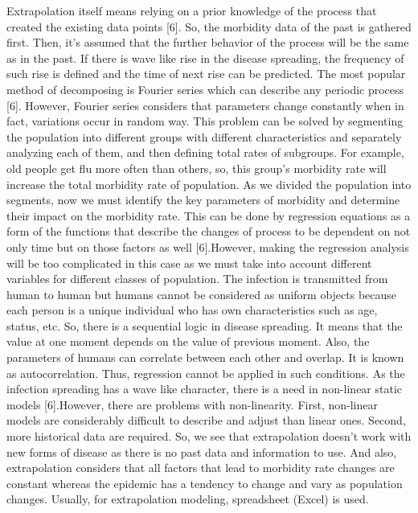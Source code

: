 Extrapolation itself means relying on a prior knowledge of the process that created the existing data points [6]. So, the morbidity data of the past is gathered first. Then, it’s assumed that the further behavior of the process will be the same as in the past. If there is wave like rise in the disease spreading, the frequency of such rise is defined and the time of next rise can be predicted. The most popular method of decomposing is Fourier series which can describe any periodic process [6]. However, Fourier series considers that parameters change constantly when in fact, variations occur in random way. This problem can be solved by segmenting the population into different groups with different characteristics and separately analyzing each of them, and then defining total rates of subgroups. For example, old people get flu more often than others, so, this group’s morbidity rate will increase the total morbidity rate of population. As we divided the population into segments, now we must identify the key parameters of morbidity and determine their impact on the morbidity rate. This can be done by regression equations as a form of the functions that describe the changes of process to be dependent on not only time but on those factors as well [6].However, making the regression analysis will be too complicated in this case as we must take into account different variables for different classes of population. The infection is transmitted from human to human but humans cannot be considered as uniform objects because each person is a unique individual who has own characteristics such as age, status, etc. So, there is a sequential logic in disease spreading. It means that the value at one moment depends on the value of previous moment. Also, the parameters of humans can correlate between each other and overlap. It is known as autocorrelation. Thus, regression cannot be applied in such conditions. As the infection spreading has a wave like character, there is a need in non-linear static models [6].However, there are problems with non-linearity. First, non-linear models are considerably difficult to describe and adjust than linear ones. Second, more historical data are required. So, we see that extrapolation doesn’t work with new forms of disease as there is no past data and information to use. And also, extrapolation considers that all factors that lead to morbidity rate changes are constant whereas the epidemic has a tendency to change and vary as population changes. Usually, for extrapolation modeling, spreadsheet (Excel) is used.

